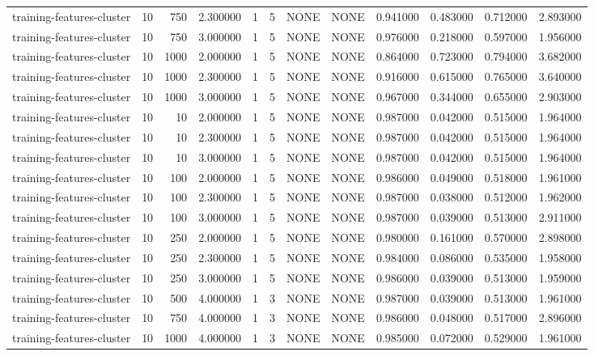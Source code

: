 \begin{tabular}{lrrrllllrrrr}
training-features-cluster & 10 & 750 & 2.300000 & 1 & 5 & NONE & NONE & 0.941000 & 0.483000 & 0.712000 & 2.893000 \\
training-features-cluster & 10 & 750 & 3.000000 & 1 & 5 & NONE & NONE & 0.976000 & 0.218000 & 0.597000 & 1.956000 \\
training-features-cluster & 10 & 1000 & 2.000000 & 1 & 5 & NONE & NONE & 0.864000 & 0.723000 & 0.794000 & 3.682000 \\
training-features-cluster & 10 & 1000 & 2.300000 & 1 & 5 & NONE & NONE & 0.916000 & 0.615000 & 0.765000 & 3.640000 \\
training-features-cluster & 10 & 1000 & 3.000000 & 1 & 5 & NONE & NONE & 0.967000 & 0.344000 & 0.655000 & 2.903000 \\
training-features-cluster & 10 & 10 & 2.000000 & 1 & 5 & NONE & NONE & 0.987000 & 0.042000 & 0.515000 & 1.964000 \\
training-features-cluster & 10 & 10 & 2.300000 & 1 & 5 & NONE & NONE & 0.987000 & 0.042000 & 0.515000 & 1.964000 \\
training-features-cluster & 10 & 10 & 3.000000 & 1 & 5 & NONE & NONE & 0.987000 & 0.042000 & 0.515000 & 1.964000 \\
training-features-cluster & 10 & 100 & 2.000000 & 1 & 5 & NONE & NONE & 0.986000 & 0.049000 & 0.518000 & 1.961000 \\
training-features-cluster & 10 & 100 & 2.300000 & 1 & 5 & NONE & NONE & 0.987000 & 0.038000 & 0.512000 & 1.962000 \\
training-features-cluster & 10 & 100 & 3.000000 & 1 & 5 & NONE & NONE & 0.987000 & 0.039000 & 0.513000 & 2.911000 \\
training-features-cluster & 10 & 250 & 2.000000 & 1 & 5 & NONE & NONE & 0.980000 & 0.161000 & 0.570000 & 2.898000 \\
training-features-cluster & 10 & 250 & 2.300000 & 1 & 5 & NONE & NONE & 0.984000 & 0.086000 & 0.535000 & 1.958000 \\
training-features-cluster & 10 & 250 & 3.000000 & 1 & 5 & NONE & NONE & 0.986000 & 0.039000 & 0.513000 & 1.959000 \\
training-features-cluster & 10 & 500 & 4.000000 & 1 & 3 & NONE & NONE & 0.987000 & 0.039000 & 0.513000 & 1.961000 \\
training-features-cluster & 10 & 750 & 4.000000 & 1 & 3 & NONE & NONE & 0.986000 & 0.048000 & 0.517000 & 2.896000 \\
training-features-cluster & 10 & 1000 & 4.000000 & 1 & 3 & NONE & NONE & 0.985000 & 0.072000 & 0.529000 & 1.961000 \\

\end{tabular}

